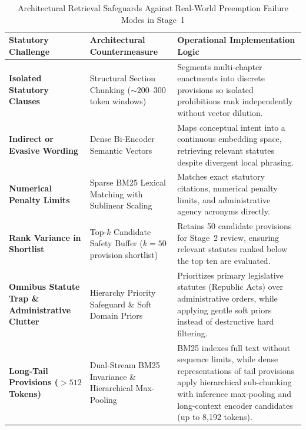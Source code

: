     \begin{table}[!htbp]
        \centering
        \footnotesize
        \renewcommand{\arraystretch}{0.95}
        \setlength{\tabcolsep}{4pt}
        \caption[Architectural Retrieval Safeguards Against Preemption Failure Modes]{Architectural Retrieval Safeguards Against Real-World Preemption Failure Modes in Stage~1}
        \label{tab:retrieval_safeguards}
        \begin{tabularx}{\linewidth}{>{\RaggedRight}p{2.8cm}>{\RaggedRight}p{3.8cm}>{\RaggedRight}X}
            \toprule
            \textbf{Statutory Challenge} & \textbf{Architectural Countermeasure} & \textbf{Operational Implementation Logic} \\
            \midrule
            \textbf{Isolated Statutory Clauses} & Structural Section Chunking ($\sim 200\text{--}300$ token windows) & Segments multi-chapter enactments into discrete provisions so isolated prohibitions rank independently without vector dilution. \\
            \addlinespace[2pt]
            \textbf{Indirect or Evasive Wording} & Dense Bi-Encoder Semantic Vectors & Maps conceptual intent into a continuous embedding space, retrieving relevant statutes despite divergent local phrasing. \\
            \addlinespace[2pt]
            \textbf{Numerical Penalty Limits} & Sparse BM25 Lexical Matching with Sublinear Scaling & Matches exact statutory citations, numerical penalty limits, and administrative agency acronyms directly. \\
            \addlinespace[2pt]
            \textbf{Rank Variance in Shortlist} & Top-$k$ Candidate Safety Buffer ($k = 50$ provision shortlist) & Retains 50 candidate provisions for Stage~2 review, ensuring relevant statutes ranked below the top ten are evaluated. \\
            \addlinespace[2pt]
            \textbf{Omnibus Statute Trap \& Administrative Clutter} & Hierarchy Priority Safeguard \& Soft Domain Priors & Prioritizes primary legislative statutes (Republic Acts) over administrative orders, while applying gentle soft priors instead of destructive hard filtering. \\
            \addlinespace[2pt]
            \textbf{Long-Tail Provisions ($> 512$ Tokens)} & Dual-Stream BM25 Invariance \& Hierarchical Max-Pooling & BM25 indexes full text without sequence limits, while dense representations of tail provisions apply hierarchical sub-chunking with inference max-pooling and long-context encoder candidates (up to 8,192 tokens). \\
            \bottomrule
        \end{tabularx}
    \end{table}

